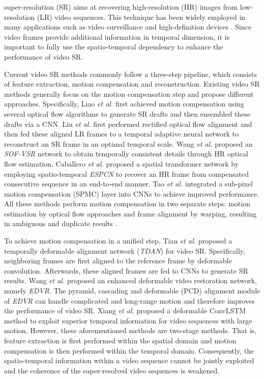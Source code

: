 \documentclass[journal]{IEEEtran}
\begin{document}
 super-resolution (SR) aims at recovering high-resolution (HR) images from low-resolution (LR) video sequences. This technique has been widely employed in many applications such as video surveillance \cite{surveillance1} and high-definition devices \cite{high1,high2}. Since video frames provide additional information in temporal dimension, it is important to fully use the spatio-temporal dependency to enhance the performance of video SR.

Current video SR methods commonly follow a three-step pipeline, which consists of feature extraction, motion compensation and reconstruction. Existing video SR methods generally focus on the motion compensation step and propose different approaches. Specifically, Liao \textit{et al.} \cite{draft} first achieved motion compensation using several optical flow algorithms to generate SR drafts and then ensembled these drafts via a CNN. Liu \textit{et al.} \cite{temporal_dynamic1,temporal_dynamic2} first performed rectified optical flow alignment and then fed these aligned LR frames to a temporal adaptive neural network to reconstruct an SR frame in an optimal temporal scale. Wang \textit{et al.} \cite{SOFVSR18,SOFVSR20} proposed an \textit{SOF-VSR} network to obtain temporally consistent details through HR optical flow estimation. Caballero \textit{et al.} \cite{VESPCN} proposed a spatial transformer network by employing spatio-temporal \textit{ESPCN} \cite{ESPCN} to recover an HR frame from compensated consecutive sequence in an end-to-end manner. Tao \textit{et al.} \cite{DRVSR} integrated a sub-pixel motion compensation (SPMC) layer into CNNs to achieve improved performance. All these methods perform motion compensation in two separate steps: motion estimation by optical flow approaches and frame alignment by warping, resulting in ambiguous and duplicate results \cite{Devon, TGA-VSR}.

 To achieve motion compensation in a unified step, Tian \textit{et al.} \cite{TDAN} proposed a temporally deformable alignment network (\textit{TDAN}) for video SR. Specifically, neighboring frames are first aligned to the reference frame by deformable convolution. Afterwards, these aligned frames are fed to CNNs to generate SR results. Wang \textit{et al.} \cite{EDVR} proposed an enhanced deformable video restoration network, namely \textit{EDVR}. The pyramid, cascading and deformable (PCD) alignment module of \textit{EDVR} can handle complicated and long-range motion and therefore improves the performance of video SR. Xiang \textit{et al.} \cite{zooming} proposed a deformable ConvLSTM method to exploit superior temporal information for video sequences with large motion. However, these aforementioned methods are two-stage methods. That is, feature extraction is first performed within the spatial domain and motion compensation is then performed within the temporal domain. Consequently, the spatio-temporal information within a video sequence cannot be jointly exploited and the coherence of the super-resolved video sequences is weakened.
\end{document}
